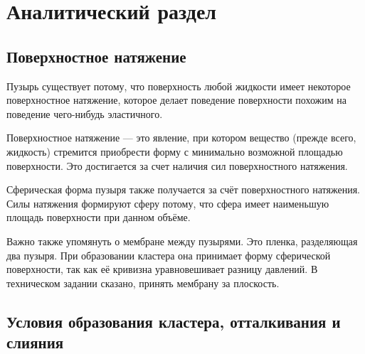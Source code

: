 \chapter{Аналитический раздел}
\section{Поверхностное натяжение}
Пузырь существует потому, что поверхность любой жидкости имеет некоторое поверхностное натяжение, которое делает поведение поверхности похожим на поведение чего-нибудь эластичного.

Поверхностное натяжение \cite{surface_tension} — это явление, при котором вещество (прежде всего, жидкость) стремится приобрести форму с минимально возможной площадью поверхности. Это достигается за счет наличия сил поверхностного натяжения.

Сферическая форма пузыря также получается за счёт поверхностного натяжения. Силы натяжения формируют сферу потому, что сфера имеет наименьшую площадь поверхности при данном объёме.  

Важно также упомянуть о мембране между пузырями. Это пленка, разделяющая два пузыря. При образовании кластера она принимает форму сферической поверхности, так как её кривизна уравновешивает разницу давлений. В техническом задании сказано, принять мембрану за плоскость.

\section{Условия образования кластера, отталкивания и слияния}

